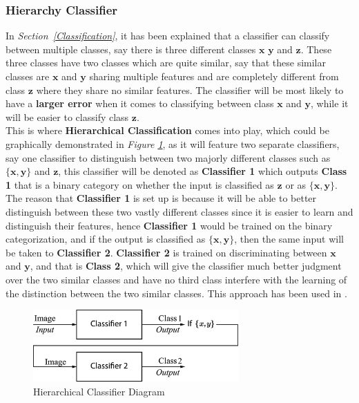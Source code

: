 \documentclass[12pt]{extarticle}
\begin{document}
	\subsubsection{Hierarchy Classifier}
	In \emph{Section~\ref{Classification}}, it has been explained that a classifier can classify between multiple classes, say there is three different classes $\bm{x}$ $\bm{y}$ and $\bm{z}$. These three classes have two classes which are quite similar, say that these similar classes are $\bm{x}$ and $\bm{y}$ sharing multiple features and are completely different from class $\bm{z}$ where they share no similar features. The classifier will be most likely to have a \textbf{larger error} when it comes to classifying between class $\bm{x}$ and $\bm{y}$, while it will be easier to classify class $\bm{z}$.\\[5mm]
	This is where \textbf{Hierarchical Classification} comes into play, which could be graphically demonstrated in \emph{Figure \ref{fig:Hierarchical Classifier}}, as it will feature two separate classifiers, say one classifier to distinguish between two majorly different classes such as $\bm{\{x,y\}}$ and $\bm{z}$, this classifier will be denoted as \textbf{Classifier 1} which outputs \textbf{Class 1} that is a binary category on whether the input is classified as $\bm{z}$ or as $\bm{\{x,y\}}$. The reason that \textbf{Classifier 1} is set up is because it will be able to better distinguish between these two vastly different classes since it is easier to learn and distinguish their features, hence \textbf{Classifier 1} would be trained on the binary categorization, and if the output is classified as $\bm{\{x,y\}}$, then the same input will be taken to \textbf{Classifier 2}. \textbf{Classifier 2} is trained on discriminating between $\bm{x}$ and $\bm{y}$, and that is \textbf{Class 2}, which will give the classifier much better judgment over the two similar classes and have no third class interfere with the learning of the distinction between the two similar classes. This approach has been used in \cite{GJU}.
	\begin{figure}[h]
		\centering
		\includegraphics[width=0.7\textwidth]{pics/Figures/Hierarchical_Classifier_Block_Diagram.eps}
		\caption{\small{Hierarchical Classifier Diagram}}
		\label{fig:Hierarchical Classifier}
	\end{figure}
	
\end{document}
